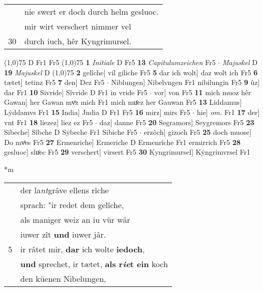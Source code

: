 \documentclass[8pt,a4paper,notitlepage]{article}
\begin{document}
\begin{table}[ht]
\begin{minipage}[t]{0.5\linewidth}
\begin{tabular}{rl}
 & nie swert er doch durch helm gesluoc.\\ 
 & mir wirt verschert nimmer vel\\ 
30 & durch iuch, hêr Kyngrimursel.\\ 
\end{tabular}
\scriptsize
\line(1,0){75} \newline
D Fr1 Fr5 \newline
\line(1,0){75} \newline
\textbf{1} \textit{Initiale} D Fr5  \textbf{13} \textit{Capitulumzeichen} Fr5   $\cdot$ \textit{Majuskel} D  \textbf{19} \textit{Majuskel} D  \newline
\line(1,0){75} \newline
\textbf{2} gelîche] vil giliche Fr5 \textbf{5} dar ich wolt] daz wolt ich Fr5 \textbf{6} tætet] tetinz Fr5 \textbf{7} den] Dez Fr5  $\cdot$ Niblungen] Nibelvngen Fr1 nibilungin Fr5 \textbf{9} ûz] dar Fr1 \textbf{10} Sivride] Sîvride D Fr1 in vride Fr5  $\cdot$ vor] von Fr5 \textbf{11} mich muoz hêr Gawan] her Gawan mvͦz mich Fr1 mich muͦez her Gauwan Fr5 \textbf{13} Liddamus] Lẏddamvs Fr1 \textbf{15} India] Jndia D Fr1 Fr5 \textbf{16} mirz] mirs Fr5  $\cdot$ hie] \textit{om.} Fr1 \textbf{17} der] vnt Fr1 \textbf{18} liezez] liez ez Fr5  $\cdot$ daz] danne Fr5 \textbf{20} Segramors] Seygremors Fr5 \textbf{23} Sibeche] Sîbche D Sẏbeche Fr1 Sibiche Fr5  $\cdot$ erzôch] gizoch Fr5 \textbf{25} doch muose] Do mvͦes Fr5 \textbf{27} Ermenriche] Ermeriche D Ermenrîche Fr1 ermirrich Fr5 \textbf{28} gesluoc] sluͦec Fr5 \textbf{29} verschert] virsert Fr5 \textbf{30} Kyngrimursel] Kẏngrimvrsel Fr1 \newline
\end{minipage}
\hspace{0.5cm}
\begin{minipage}[t]{0.5\linewidth}
\small
\begin{center}*m
\end{center}
\begin{tabular}{rl}
 & der la\textit{nt}grâve ellens rîche\\ 
 & sprach: "ir redet dem gelîche,\\ 
 & als maniger weiz an iu vür wâr\\ 
 & iuwer zît \textbf{und} iuwer jâr.\\ 
5 & ir râtet mir, \textbf{dar} ich wolte \textbf{iedoch},\\ 
 & \textbf{und} sprechet, ir tætet, \textbf{als r\textit{ie}t ein} koch\\ 
 & den küenen Nibelungen,\\ 

\end{tabular}
\end{minipage}
\end{table}
\end{document}

